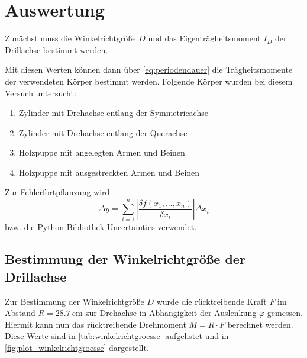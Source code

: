 \section{Auswertung}
\label{sec:Auswertung}



Zunächst muss die Winkelrichtgröße $D$ und das Eigenträgheitsmoment $I_D$ der Drillachse bestimmt werden.

Mit diesen Werten können dann über \autoref{eq:periodendauer} die Trägheitsmomente der verwendeten Körper bestimmt werden. Folgende Körper wurden bei diesem Versuch untersucht:
\begin{enumerate}
    \item Zylinder mit Drehachse entlang der Symmetrieachse
    \item Zylinder mit Drehachse entlang der Querachse
    \item Holzpuppe mit angelegten Armen und Beinen
    \item Holzpuppe mit ausgestreckten Armen und Beinen
\end{enumerate}

Zur Fehlerfortpflanzung wird 
\begin{equation}
    \Delta y = \sum_{i=1}^n \left| \frac{\delta f(x_1,...,x_n)}{\delta x_i} \right| \Delta x_i
    \label{eq:fehlerrechnung}
\end{equation}
bzw. die Python Bibliothek Uncertainties verwendet.\cite{uncertainties}

\subsection{Bestimmung der Winkelrichtgröße der Drillachse}
\label{sec:winkelrichtgroesse}

Zur Bestimmung der Winkelrichtgröße $D$ wurde die rücktreibende Kraft $F$ im Abstand $R=\SI{28.7}{\centi\meter}$ zur Drehachse in Abhängigkeit der Auslenkung $\varphi$ gemessen. Hiermit kann nun das rücktreibende Drehmoment $M=R \cdot F$ berechnet werden. Diese Werte sind in \autoref{tab:winkelrichtgroesse} aufgelistet und in \autoref{fig:plot_winkelrichtgroesse} dargestellt.

